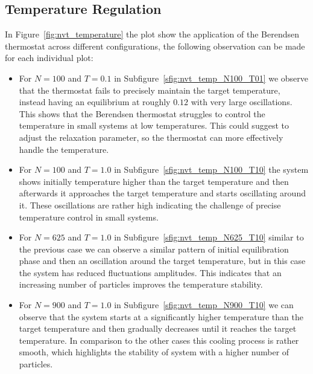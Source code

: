 \subsection{Temperature Regulation}
In Figure~\ref{fig:nvt_temperature} the plot show the application of the Berendsen thermostat across different configurations, the following observation can be made for each individual plot:
\begin{itemize}
	\item For $N=100$ and $T=0.1$ in Subfigure~\ref{sfig:nvt_temp_N100_T01} we observe that the thermostat fails to precisely maintain the target temperature, instead having an equilibrium at roughly $0.12$ with very large oscillations. This shows that the Berendsen thermostat struggles to control the temperature in small systems at low temperatures. This could suggest to adjust the relaxation parameter, so the thermostat can more effectively handle the temperature.
	\item For $N=100$ and $T=1.0$ in Subfigure~\ref{sfig:nvt_temp_N100_T10} the system shows initially temperature higher than the target temperature and then afterwards it approaches the target temperature and starts oscillating around it. These oscillations are rather high indicating the challenge of precise temperature control in small systems.
	\item For $N=625$ and $T=1.0$ in Subfigure~\ref{sfig:nvt_temp_N625_T10} similar to the previous case we can observe a similar pattern of initial equilibration phase and then an oscillation around the target temperature, but in this case the system has reduced fluctuations amplitudes. This indicates that an increasing number of particles improves the temperature stability.
	\item For $N=900$ and $T=1.0$ in Subfigure~\ref{sfig:nvt_temp_N900_T10} we can observe that the system starts at a significantly higher temperature than the target temperature and then gradually decreases until it reaches the target temperature. In comparison to the other cases this cooling process is rather smooth, which highlights the stability of system with a higher number of particles.
\end{itemize}

